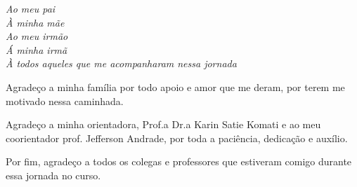 \documentclass[times,english,brazil,oneside, a4paper, fleqn]{ifes8}
\begin{document}
\renewcommand{\afterchapternum}{\hspace{-4pt}}


\imprimircapa

\imprimirfolhaderosto*



%

\addtocounter{page}{-1}

%

\newpage



%


\begin{dedicatoria}
  \vspace*{\fill}
 \hspace{0.3\textwidth}
  \begin{minipage}[t][4cm]{0.8\textwidth} 
   \textit{Ao meu pai }  \\
   \textit{À minha mãe }  \\
   \textit{Ao meu irmão }  \\
   \textit{Á minha irmã }  \\
   \textit{À todos aqueles que me acompanharam nessa jornada} 
  \end{minipage}
\end{dedicatoria}


\begin{agradecimentos}
Agradeço a minha família por todo apoio e amor que me deram, por terem me motivado nessa caminhada.

Agradeço a minha orientadora, Prof.a Dr.a Karin Satie Komati e ao meu coorientador prof. Jefferson Andrade, por toda a paciência, dedicação e auxílio.

Por fim, agradeço a todos os colegas e professores que estiveram comigo durante essa jornada no curso.
\end{agradecimentos}
\end{document}
